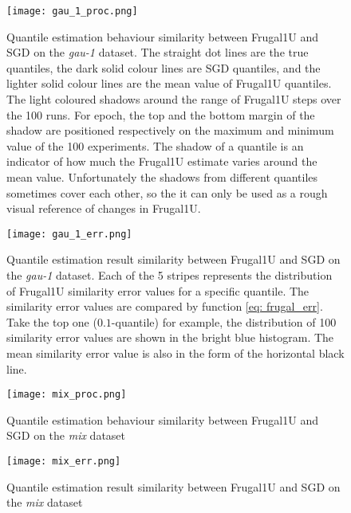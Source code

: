 \begin{figure}[h!]
    \centering
    \texttt{[image: gau\_1\_proc.png]}
    \caption{Quantile estimation behaviour similarity between Frugal1U and SGD on the \textit{gau-1} dataset. The straight dot lines are the true quantiles, the dark solid colour lines are SGD quantiles, and the lighter solid colour lines are the mean value of Frugal1U quantiles. The light coloured shadows around the range of Frugal1U steps over the 100 runs. For epoch, the top and the bottom margin of the shadow are positioned respectively on the maximum and minimum value of the 100 experiments. The shadow of a quantile is an indicator of how much the Frugal1U estimate varies around the mean value. Unfortunately the shadows from different quantiles sometimes cover each other, so the it can only be used as a rough visual reference of changes in Frugal1U.}
    \label{fig: gau_1_proc}
\end{figure}


\begin{figure}[h!]
    \centering
	\texttt{[image: gau\_1\_err.png]}
    \caption{Quantile estimation result similarity between Frugal1U and SGD on the \textit{gau-1} dataset.
    Each of the 5 stripes represents the distribution of Frugal1U similarity error values for a specific quantile. The similarity error values are compared by function \eqref{eq: frugal_err}. Take the top one ($0.1$-quantile) for example, the distribution of 100 similarity error values are shown in the bright blue histogram. The mean similarity error value is also in the form of the horizontal black line.}
    \label{fig: gau_1_err}
\end{figure}

\begin{figure}[h!]
    \centering
	\texttt{[image: mix\_proc.png]}
    \caption{Quantile estimation behaviour similarity between Frugal1U and SGD on the \textit{mix} dataset}
    \label{fig: mix_proc}
\end{figure}

\begin{figure}[h!]
    \centering
	\texttt{[image: mix\_err.png]}
    \caption{Quantile estimation result similarity between Frugal1U and SGD on the \textit{mix} dataset}
    \label{fig: mix_err}
\end{figure}

